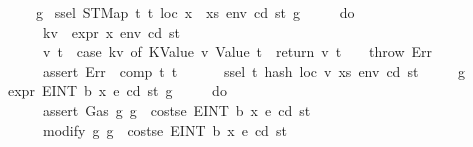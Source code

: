 \begin{isabellebody}
\ \ \ \ {\isacharbraceright}{\kern0pt}{\isacharparenright}{\kern0pt}\ g{\isachardoublequoteclose}\isanewline
{\isacharbar}{\kern0pt}\ {\isachardoublequoteopen}ssel\ {\isacharparenleft}{\kern0pt}STMap\ t\ t{\isacharprime}{\kern0pt}{\isacharparenright}{\kern0pt}\ loc\ {\isacharparenleft}{\kern0pt}x\ {\isacharhash}{\kern0pt}\ xs{\isacharparenright}{\kern0pt}\ env\ cd\ st\ g\ {\isacharequal}{\kern0pt}\isanewline
\ \ \ \ {\isacharparenleft}{\kern0pt}do\ {\isacharbraceleft}{\kern0pt}\isanewline
\ \ \ \ \ \ kv\ {\isasymleftarrow}\ expr\ x\ env\ cd\ st{\isacharsemicolon}{\kern0pt}\isanewline
\ \ \ \ \ \ {\isacharparenleft}{\kern0pt}v{\isacharcomma}{\kern0pt}\ t{\isacharprime}{\kern0pt}{\isacharprime}{\kern0pt}{\isacharparenright}{\kern0pt}\ {\isasymleftarrow}\ case\ kv\ of\ {\isacharparenleft}{\kern0pt}KValue\ v{\isacharcomma}{\kern0pt}\ Value\ t{\isacharprime}{\kern0pt}{\isacharprime}{\kern0pt}{\isacharparenright}{\kern0pt}\ {\isasymRightarrow}\ return\ {\isacharparenleft}{\kern0pt}v{\isacharcomma}{\kern0pt}\ t{\isacharprime}{\kern0pt}{\isacharprime}{\kern0pt}{\isacharparenright}{\kern0pt}\ {\isacharbar}{\kern0pt}\ {\isacharunderscore}{\kern0pt}\ {\isasymRightarrow}\ throw\ Err{\isacharsemicolon}{\kern0pt}\isanewline
\ \ \ \ \ \ assert\ Err\ {\isacharparenleft}{\kern0pt}{\isasymlambda}{\isacharunderscore}{\kern0pt}{\isachardot}{\kern0pt}\ comp\ t{\isacharprime}{\kern0pt}{\isacharprime}{\kern0pt}\ t{\isacharparenright}{\kern0pt}{\isacharsemicolon}{\kern0pt}\isanewline
\ \ \ \ \ \ ssel\ t{\isacharprime}{\kern0pt}\ {\isacharparenleft}{\kern0pt}hash\ loc\ v{\isacharparenright}{\kern0pt}\ xs\ env\ cd\ st\isanewline
\ \ \ \ {\isacharbraceright}{\kern0pt}{\isacharparenright}{\kern0pt}\ g{\isachardoublequoteclose}\isanewline
{\isacharbar}{\kern0pt}\ {\isachardoublequoteopen}expr\ {\isacharparenleft}{\kern0pt}E{\isachardot}{\kern0pt}INT\ b\ x{\isacharparenright}{\kern0pt}\ e\ cd\ st\ g\ {\isacharequal}{\kern0pt}\isanewline
\ \ \ \ {\isacharparenleft}{\kern0pt}do\ {\isacharbraceleft}{\kern0pt}\isanewline
\ \ \ \ \ \ assert\ Gas\ {\isacharparenleft}{\kern0pt}{\isasymlambda}g{\isachardot}{\kern0pt}\ g\ {\isachargreater}{\kern0pt}\ costs\isactrlsub e\ {\isacharparenleft}{\kern0pt}E{\isachardot}{\kern0pt}INT\ b\ x{\isacharparenright}{\kern0pt}\ e\ cd\ st{\isacharparenright}{\kern0pt}{\isacharsemicolon}{\kern0pt}\isanewline
\ \ \ \ \ \ modify\ {\isacharparenleft}{\kern0pt}{\isasymlambda}g{\isachardot}{\kern0pt}\ g\ {\isacharminus}{\kern0pt}\ costs\isactrlsub e\ {\isacharparenleft}{\kern0pt}E{\isachardot}{\kern0pt}INT\ b\ x{\isacharparenright}{\kern0pt}\ e\ cd\ st{\isacharparenright}{\kern0pt}{\isacharsemicolon}{\kern0pt}\isanewline

\end{isabellebody}
